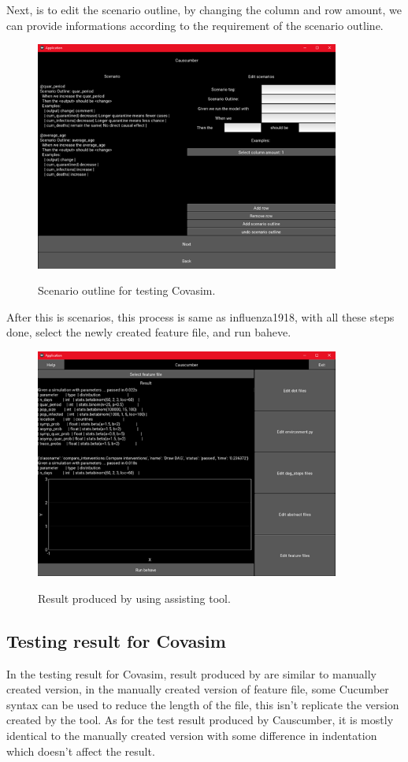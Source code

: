 Next, is to edit the scenario outline, by changing the column and row amount, we can provide informations according to the requirement of the scenario outline.
\begin{figure}[H]
	\centering
	\includegraphics[width=10cm]{figures/CovasimTestProcess5.png}\\
	\caption{Scenario outline for testing Covasim.}
	\label{fig:figure38}
\end{figure}
After this is scenarios, this process is same as influenza1918, with all these steps done, select the newly created feature file, and run baheve.
\begin{figure}[H]
	\centering
	\includegraphics[width=10cm]{figures/CovasimTestProcess6.png}\\
	\caption{Result produced by using assisting tool.}
	\label{fig:figure39}
\end{figure}
\subsection{Testing result for Covasim}
In the testing result for Covasim, result produced by are similar to manually created version, in the manually created version of feature file, some Cucumber syntax can be used to reduce the length of the file, this isn’t replicate the version created by the tool. As for the test result produced by Causcumber, it is mostly identical to the manually created version with some difference in indentation which doesn’t affect the result.

